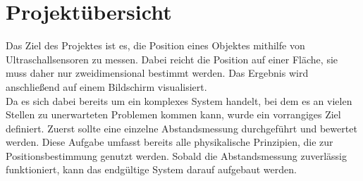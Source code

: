 


\chapter{Projektübersicht}

Das Ziel des Projektes ist es, die Position eines Objektes mithilfe von Ultraschallsensoren zu messen. Dabei reicht die Position auf einer Fläche, sie muss daher nur zweidimensional bestimmt werden. Das Ergebnis wird anschließend auf einem Bildschirm visualisiert.\\
Da es sich dabei bereits um ein komplexes System handelt, bei dem es an vielen Stellen zu unerwarteten Problemen kommen kann, wurde ein vorrangiges Ziel definiert. Zuerst sollte eine einzelne Abstandsmessung durchgeführt und bewertet werden. Diese Aufgabe umfasst bereits alle physikalische Prinzipien, die zur Positionsbestimmung genutzt werden. Sobald die Abstandsmessung zuverlässig funktioniert, kann das endgültige System darauf aufgebaut werden.


